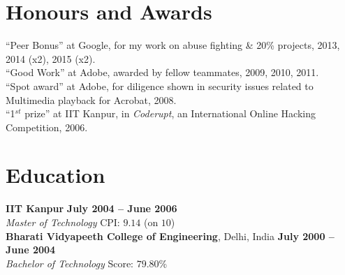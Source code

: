 \documentclass[margin,line]{resume}
\begin{document}
\begin{resume}
	\section{Honours and Awards}
	``Peer Bonus'' at Google, for my work on abuse fighting \& 20\% projects, 2013, 2014 (x2), 2015 (x2).\\
	``Good Work'' at Adobe, awarded by fellow teammates, 2009, 2010, 2011.\\
	``Spot award'' at Adobe, for diligence shown in security issues related to Multimedia playback for Acrobat, 2008.\\
	``1$^{st}$ prize'' at IIT Kanpur, in \textit{Coderupt}, an International Online Hacking Competition, 2006.

	\section{Education}

	\textbf{IIT Kanpur} \hfill \textbf{July 2004 -- June 2006}\\
	\textsl{Master of Technology} \hfill CPI: $9.14$ (on $10$)\\%
	\textbf{Bharati Vidyapeeth College of Engineering}, Delhi, India \hfill \textbf{July 2000 -- June 2004}\\
	\textsl{Bachelor of Technology} \hfill Score: $79.80$\%

	\end{resume}
\end{document}
